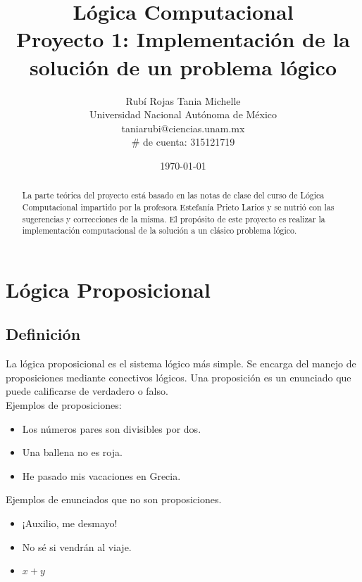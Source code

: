 \documentclass[letterpaper,11pt]{article}
\title{Lógica Computacional \\ 
Proyecto 1: Implementación de la solución de un problema lógico}
\author{Rubí Rojas Tania Michelle \\
        Universidad Nacional Autónoma de México \\
        taniarubi@ciencias.unam.mx \\
        $\#$ de cuenta: 315121719}
\date{\today}
\begin{document}
    \maketitle

    \begin{abstract}
        La parte teórica del proyecto está basado en las notas de clase del
        curso de Lógica Computacional impartido por la profesora Estefanía 
        Prieto Larios y se nutrió con las sugerencias y correcciones de la 
        misma. El propósito de este proyecto es realizar la implementación 
        computacional de la solución a un clásico problema lógico.
    \end{abstract}

    \section{Lógica Proposicional}

    \subsection{Definición}
    La lógica proposicional es el sistema lógico más simple. Se encarga del 
    manejo de proposiciones mediante conectivos lógicos. Una proposición es
    un enunciado que puede calificarse de verdadero o falso. \\
    Ejemplos de proposiciones:
    \begin{itemize}
        \item Los números pares son divisibles por dos. 
        \item Una ballena no es roja.
        \item He pasado mis vacaciones en Grecia.
    \end{itemize}

    \justify
    Ejemplos de enunciados que no son proposiciones.
    \begin{itemize}
        \item ¡Auxilio, me desmayo!
        \item No sé si vendrán al viaje.
        \item $x + y$
    \end{itemize}

\end{document}

